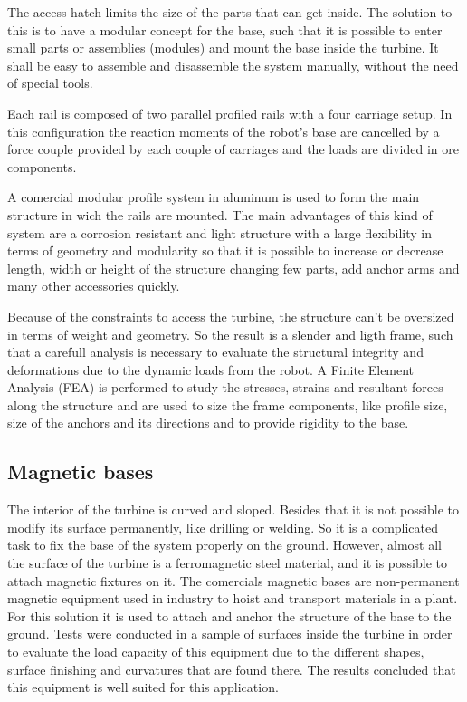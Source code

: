 The access hatch limits the size of the parts that can get
inside. The solution to this is to have a modular concept for the base, such
that it is possible to enter small parts or assemblies (modules) and mount
the base inside the turbine. It shall be easy to assemble and disassemble the
system manually, without the need of special tools. 

Each rail is composed of two parallel profiled rails with a four carriage setup.
In this configuration the reaction moments of the robot's base are cancelled by
a force couple provided by each couple of carriages and the loads are divided in
ore components.

A comercial modular profile system in aluminum is used to form the main
structure in wich the rails are mounted. 
The main advantages of this kind of system are a corrosion resistant and light
structure with a large flexibility in terms of geometry and modularity so that
it is possible to increase or decrease length, width or height of the structure
changing few parts, add anchor arms and many other accessories quickly.

Because of the constraints to access the turbine, the structure can't be
oversized in terms of weight and geometry. So the result is a slender and ligth
frame, such that a carefull analysis is necessary to evaluate the structural
integrity and deformations due to the dynamic loads from the robot.
A Finite Element Analysis (FEA) is performed to study the stresses, strains and
resultant forces along the structure and are used to size the frame components,
like profile size, size of the anchors and its directions and to provide rigidity to the
base.


\subsection{Magnetic bases}

The interior of the turbine is curved and sloped. Besides that it is not
possible to modify its surface permanently, like drilling or welding. 
So it is a complicated task to fix the base of the system properly on the
ground.
However, almost all the surface of the turbine is a ferromagnetic steel
material, and it is possible to attach magnetic fixtures on it.
The comercials magnetic bases are non-permanent magnetic equipment used in
industry to hoist and transport materials in a plant. 
For this solution it is used to attach and anchor the structure of the base to
the ground. 
Tests were conducted in a sample of surfaces inside the turbine in order to
evaluate the load capacity of this equipment due to the different shapes,
surface finishing and curvatures that are found there.
The results concluded that this equipment is well suited for this application.



